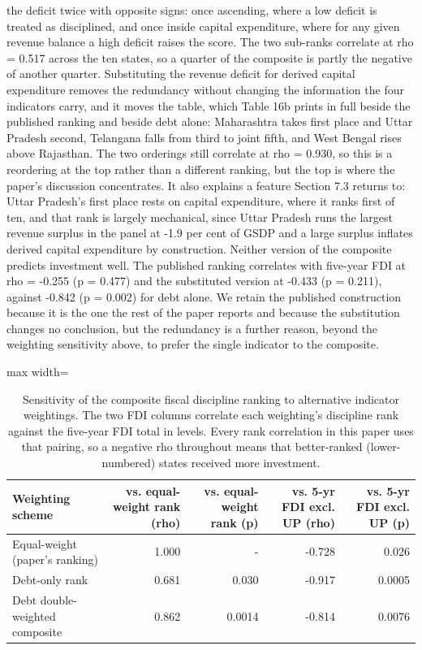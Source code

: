 \documentclass[12pt,a4paper]{article}
\begin{document}
the deficit twice with opposite signs: once ascending, where a low deficit is treated as disciplined, and once inside capital expenditure, where for any given revenue balance a high deficit raises the score. The two sub-ranks correlate at rho = 0.517 across the ten states, so a quarter of the composite is partly the negative of another quarter. Substituting the revenue deficit for derived capital expenditure removes the redundancy without changing the information the four indicators carry, and it moves the table, which Table 16b prints in full beside the published ranking and beside debt alone: Maharashtra takes first place and Uttar Pradesh second, Telangana falls from third to joint fifth, and West Bengal rises above Rajasthan. The two orderings still correlate at rho = 0.930, so this is a reordering at the top rather than a different ranking, but the top is where the paper's discussion concentrates. It also explains a feature Section 7.3 returns to: Uttar Pradesh's first place rests on capital expenditure, where it ranks first of ten, and that rank is largely mechanical, since Uttar Pradesh runs the largest revenue surplus in the panel at -1.9 per cent of GSDP and a large surplus inflates derived capital expenditure by construction. Neither version of the composite predicts investment well. The published ranking correlates with five-year FDI at rho = -0.255 (p = 0.477) and the substituted version at -0.433 (p = 0.211), against -0.842 (p = 0.002) for debt alone. We retain the published construction because it is the one the rest of the paper reports and because the substitution changes no conclusion, but the redundancy is a further reason, beyond the weighting sensitivity above, to prefer the single indicator to the composite.

\begin{table}[H]
\centering
\addtocounter{table}{-1}\renewcommand{\thetable}{\arabic{table}a}
\caption{Sensitivity of the composite fiscal discipline ranking to alternative indicator weightings. The two FDI columns correlate each weighting's discipline rank against the five-year FDI total in levels. Every rank correlation in this paper uses that pairing, so a negative rho throughout means that better-ranked (lower-numbered) states received more investment.}
\label{tab:16a}
\renewcommand{\thetable}{\arabic{table}}
\footnotesize
\begin{adjustbox}{max width=\textwidth}
\begin{tabular}{@{}lrrrr@{}}
\toprule
Weighting scheme & vs. equal-weight rank (rho) & vs. equal-weight rank (p) & vs. 5-yr FDI excl. UP (rho) & vs. 5-yr FDI excl. UP (p) \\
\midrule
Equal-weight (paper's ranking) & 1.000 & - & -0.728 & 0.026 \\
Debt-only rank & 0.681 & 0.030 & -0.917 & 0.0005 \\
Debt double-weighted composite & 0.862 & 0.0014 & -0.814 & 0.0076 \\
\bottomrule
\end{tabular}
\end{adjustbox}
\end{table}
\end{document}
